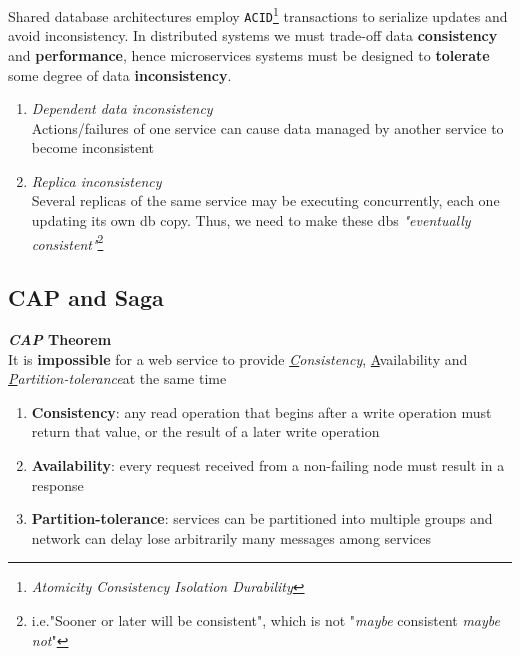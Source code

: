 Shared database architectures employ \texttt{ACID}\footnote{\textit{Atomicity Consistency Isolation Durability}} transactions to serialize updates and
avoid inconsistency.
In distributed systems we must trade-off data \textbf{consistency} and \textbf{performance},
hence microservices systems must be designed to \textbf{tolerate} some degree of data
\textbf{inconsistency}.
\begin{enumerate}
   \item \textit{Dependent data inconsistency}\\
   Actions/failures of one service can cause data managed by another service to become
   inconsistent
   \item \textit{Replica inconsistency}\\
   Several replicas of the same service may be executing concurrently,
   each one updating its own db copy.
   Thus, we need to make these dbs \textit{"eventually consistent"}\footnote{i.e."Sooner or later will be consistent", which is not "\textit{maybe} consistent \textit{maybe not}"}
\end{enumerate}

\subsection{CAP and Saga}
\begin{center}
   \textbf{\textit{CAP} Theorem}\\
   
   It is \textbf{impossible} for a web service to provide \textit{\underline{C}onsistency}, {\underline{A}vailability} and \textit{\underline{P}artition-tolerance}at the same time
   
\end{center}
\begin{enumerate}
   \item \textbf{Consistency}:
   any read operation that begins after a write operation must return that value, or the
   result of a later write operation
   \item \textbf{Availability}:
   every request received from a non-failing node must result in a response
   \item \textbf{Partition-tolerance}:
   services can be partitioned into multiple groups and network can delay lose arbitrarily many messages among services
\end{enumerate}


